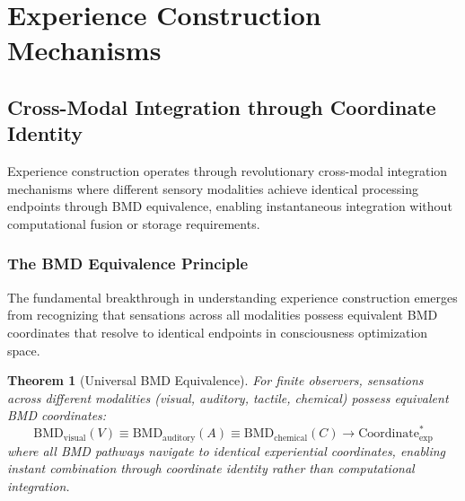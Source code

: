\documentclass{article}
\newtheorem{theorem}{Theorem}[section]
\begin{document}
\section{Experience Construction Mechanisms}

\subsection{Cross-Modal Integration through Coordinate Identity}

Experience construction operates through revolutionary cross-modal integration mechanisms where different sensory modalities achieve identical processing endpoints through BMD equivalence, enabling instantaneous integration without computational fusion or storage requirements.

\subsubsection{The BMD Equivalence Principle}

The fundamental breakthrough in understanding experience construction emerges from recognizing that sensations across all modalities possess equivalent BMD coordinates that resolve to identical endpoints in consciousness optimization space.

\begin{theorem}[Universal BMD Equivalence]
\label{thm:universal_bmd_equivalence}
For finite observers, sensations across different modalities (visual, auditory, tactile, chemical) possess equivalent BMD coordinates:
\begin{equation}
\text{BMD}_{\text{visual}}(V) \equiv \text{BMD}_{\text{auditory}}(A) \equiv \text{BMD}_{\text{chemical}}(C) \rightarrow \text{Coordinate}_{\text{exp}}^*
\end{equation}
where all BMD pathways navigate to identical experiential coordinates, enabling instant combination through coordinate identity rather than computational integration.
\end{theorem}
\end{document}
